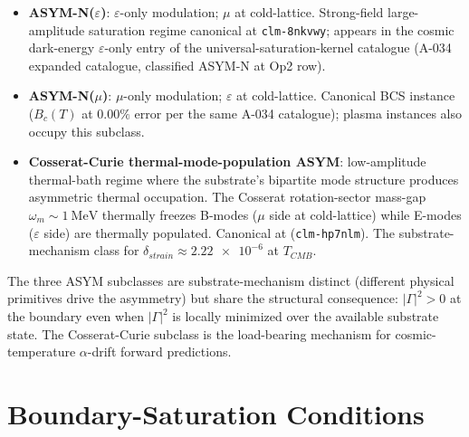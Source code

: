 \begin{itemize}
    \item \textbf{ASYM-N($\varepsilon$)}: $\varepsilon$-only modulation; $\mu$ at cold-lattice. Strong-field large-amplitude saturation regime canonical at \texttt{clm-8nkvwy}; appears in the cosmic dark-energy $\varepsilon$-only entry of the universal-saturation-kernel catalogue (A-034 expanded catalogue, classified ASYM-N at  Op2 row).
    \item \textbf{ASYM-N($\mu$)}: $\mu$-only modulation; $\varepsilon$ at cold-lattice. Canonical BCS instance ($B_c(T)$ at $0.00\%$ error per the same A-034 catalogue); plasma instances also occupy this subclass.
    \item \textbf{Cosserat-Curie thermal-mode-population ASYM}: low-amplitude thermal-bath regime where the substrate's bipartite mode structure produces asymmetric thermal occupation. The Cosserat rotation-sector mass-gap $\omega_m \sim \qty{1}{\mega\electronvolt}$ thermally freezes B-modes ($\mu$ side at cold-lattice) while E-modes ($\varepsilon$ side) are thermally populated. Canonical at  (\texttt{clm-hp7nlm}). The substrate-mechanism class for $\delta_{strain} \approx \num{2.22e-6}$ at $T_{CMB}$.
\end{itemize}

\noindent
The three ASYM subclasses are substrate-mechanism distinct (different physical primitives drive the asymmetry) but share the structural consequence: $|\Gamma|^2 > 0$ at the boundary even when $|\Gamma|^2$ is locally minimized over the available substrate state. The Cosserat-Curie subclass is the load-bearing mechanism for cosmic-temperature $\alpha$-drift forward predictions.

\section{Boundary-Saturation Conditions}
\label{sec:vol9_boundary_saturation_conditions}

